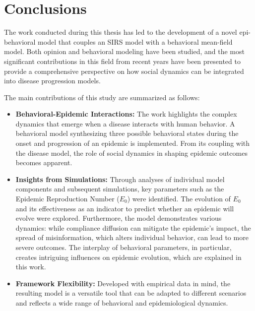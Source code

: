 \chapter{Conclusions}

The work conducted during this thesis has led to the development of a novel epi-behavioral model that couples an SIRS model with a behavioral mean-field model. Both opinion and behavioral modeling have been studied, and the most significant contributions in this field from recent years have been presented to provide a comprehensive perspective on how social dynamics can be integrated into disease progression models.

The main contributions of this study are summarized as follows:
\begin{itemize}
	
\item \textbf{Behavioral-Epidemic Interactions:} The work highlights the complex dynamics that emerge when a disease interacts with human behavior. A behavioral model synthesizing three possible behavioral states during the onset and progression of an epidemic is implemented. From its coupling with the disease model, the role of social dynamics in shaping epidemic outcomes becomes apparent.

\item \textbf{Insights from Simulations:} Through analyses of individual model components and subsequent simulations, key parameters such as the Epidemic Reproduction Number ($E_0$) were identified. The evolution of $E_0$ and its effectiveness as an indicator to predict whether an epidemic will evolve were explored. Furthermore, the model demonstrates various dynamics: while compliance diffusion can mitigate the epidemic's impact, the spread of misinformation, which alters individual behavior, can lead to more severe outcomes. The interplay of behavioral parameters, in particular, creates intriguing influences on epidemic evolution, which are explained in this work.

\item \textbf{Framework Flexibility:} Developed with empirical data in mind, the resulting model is a versatile tool that can be adapted to different scenarios and reflects a wide range of behavioral and epidemiological dynamics.
\end{itemize}